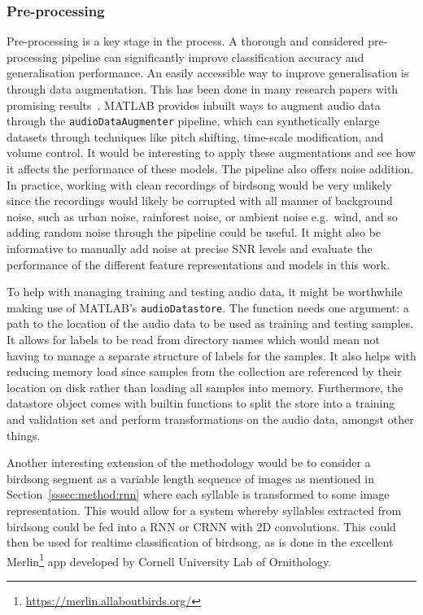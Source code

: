 \subsubsection{Pre-processing}

Pre-processing is a key stage in the process. A thorough and considered
pre-processing pipeline can significantly improve classification accuracy and
generalisation performance. An easily accessible way to improve generalisation
is through data augmentation. This has been done in many research papers with
promising results~\cite{kahl2017large}. MATLAB provides inbuilt ways to augment
audio data through the \texttt{audioDataAugmenter} pipeline, which can
synthetically enlarge datasets through techniques like pitch shifting,
time-scale modification, and volume control. It would be interesting to apply
these augmentations and see how it affects the performance of these models. The
pipeline also offers noise addition. In practice, working with clean recordings
of birdsong would be very unlikely since the recordings would likely be
corrupted with all manner of background noise, such as urban noise, rainforest
noise, or ambient noise e.g.\ wind, and so adding random noise through the
pipeline could be useful. It might also be informative to manually add noise at
precise SNR levels and evaluate the performance of the different feature
representations and models in this work.

To help with managing training and testing audio data, it might be worthwhile
making use of MATLAB's \texttt{audioDatastore}. The function needs one argument:
a path to the location of the audio data to be used as training and testing
samples. It allows for labels to be read from directory names which would
mean not having to manage a separate structure of labels for the samples. It
also helps with reducing memory load since samples from the collection are
referenced by their location on disk rather than loading all samples into memory.
Furthermore, the datastore object comes with builtin functions to split the store
into a training and validation set and perform transformations on the audio
data, amongst other things.

Another interesting extension of the methodology would be to consider a birdsong
segment as a variable length sequence of images as mentioned in
Section~\ref{sssec:method:rnn} where each syllable is transformed to some image
representation. This would allow for a system whereby syllables extracted from
birdsong could be fed into a RNN or CRNN with 2D convolutions. This could then
be used for realtime classification of birdsong, as is done in the excellent
Merlin\footnote{\url{https://merlin.allaboutbirds.org/}} app developed by
Cornell University Lab of Ornithology.

